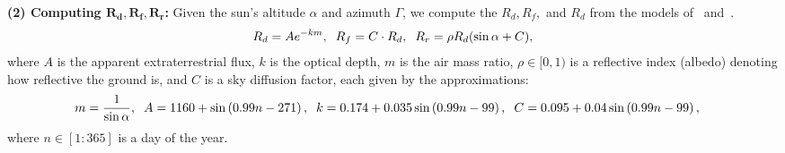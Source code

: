\documentclass{article}
\begin{document}
{\bf (2) Computing $\pmb{R_d, R_f, R_r}$:} Given the sun's altitude $\alpha$ and azimuth $\Gamma$, we compute the $R_d, R_f,$ and $R_d$ from the models of~\citet{threlkeld1957direct} and~\citet{masters2013renewable}.%
\begin{align}
R_d = A e^{-km}, \hspace{2mm} R_f = C \cdot R_d, \hspace{2mm} R_r = \rho R_d (\sin \alpha + C),
\end{align}
where $A$ is the apparent extraterrestrial flux, $k$ is the optical depth, $m$ is the air mass ratio, $\rho \in [0,1)$ is a reflective index (albedo) denoting how reflective the ground is, and $C$ is a sky diffusion factor, each given by the approximations:
\begin{align}
m&=\frac{1}{\sin \alpha}, \hspace{2mm} A = 1160 + \sin \left(0.99 n- 271\right), \hspace{2mm} k =0.174 + 0.035 \sin\left( 0.99 n - 99\right), \hspace{2mm} C=0.095 + 0.04 \sin\left(0.99 n-99\right),
\end{align}
where $n \in [1:365]$ is a day of the year.
\end{document}
